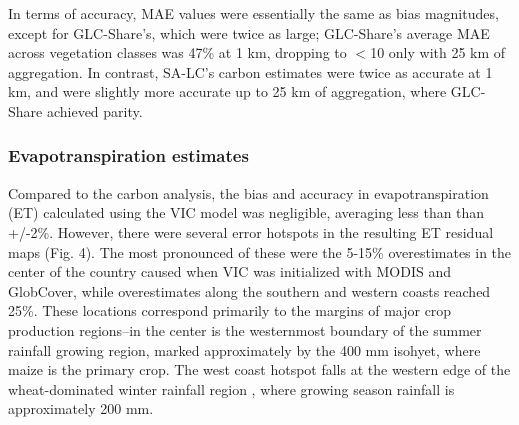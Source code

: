 \documentclass[12 pt, titlepage, a4paper]{article}
\begin{document}

In terms of accuracy, MAE values were essentially the same as bias magnitudes, except for GLC-Share's, which were twice as large; GLC-Share's average MAE across vegetation classes was 47\% at 1 km, dropping to $<$10 only with 25 km of aggregation. In contrast, SA-LC's carbon estimates were twice as accurate at 1 km, and were slightly more accurate up to 25 km of aggregation, where GLC-Share achieved parity.  

\vspace{-0.3 cm}
\subsubsection*{Evapotranspiration estimates}
\vspace{-0.2 cm}
Compared to the carbon analysis, the bias and accuracy in evapotranspiration (ET) calculated using the VIC model was negligible, averaging less than than +/-2\%. However, there were several error hotspots in the resulting ET residual maps (Fig. 4). The most pronounced of these were the 5-15\% overestimates in the center of the country caused when VIC was initialized with MODIS and GlobCover, while overestimates along the southern and western coasts reached 25\%. These locations correspond primarily to the margins of major crop production regions--in the center is the westernmost boundary of the summer rainfall growing region, marked approximately by the 400 mm isohyet, where maize is the primary crop. The west coast hotspot falls at the western edge of the wheat-dominated winter rainfall region \citep{hardy_rainfed_2011}, where growing season rainfall is approximately 200 mm. 
\end{document}
